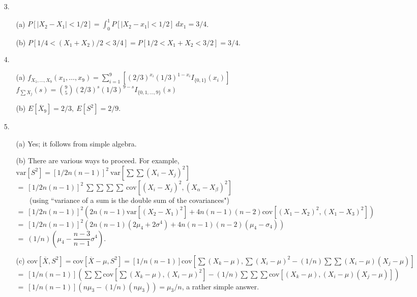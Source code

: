 \begin{enumerate}
	\item[3.] \begin{enumerate}
		\item[(a)] $P[\left\vert X_2-X_1\right\vert <1/2] = \displaystyle\int_0^1 P[\left\vert X_2-x_1\right\vert<1/2]\ dx_1 = 3/4$. 
		\item[(b)] $P[1/4 < (X_1+X_2)/2 <3/4] = P[1/2 < X_1+X_2 < 3/2] = 3/4$.
	\end{enumerate}

	\item[4.]  \begin{enumerate}
		\item[(a)] $f_{X_1,\ldots,X_9}(x_1,\ldots,x_9) = \sum\limits_{i=1}^{9}[(2/3)^{x_i}(1/3)^{1-x_i}I_{\{0,1\}}(x_i)]$ \\
		$f_{\sum X_j}(s) = \displaystyle {9\choose 5}(2/3)^s(1/3)^{9-s}I_{\{0,1,\ldots,9\}}(s)$
		\item[(b)] $E[\overline{X}_9]=2/3,\ E[S^2]=2/9$.
	\end{enumerate}

	\item[5.]  \begin{enumerate}
		\item[(a)] Yes; it follows from simple algebra.
		\item[(b)] There are various ways to proceed.  For example, \\
		$\mbox{var}[S^2]=[1/2n(n-1)]^2\ \mbox{var}[\sum\sum(X_i-X_j)^2]$ \\
		$=\ [1/2n(n-1)]^2\ \sum\sum\sum\sum\ \mbox{cov}[(X_i-X_j)^2, (X_\alpha-X_\beta)^2]$ \\
		$\phantom{=\ }$ (using ``variance of a sum is the double sum of the covariances") \\
		$=\ [1/2n(n-1)]^2(2n(n-1)\mbox{var}[(X_2-X_1)^2] + 4n(n-1)(n-2)\mbox{cov}[(X_1-X_2)^2,(X_1-X_3)^2])$ \\
		$=\ [1/2n(n-1)]^2(2n(n-1)(2\mu_4+2\sigma^4) + 4n(n-1)(n-2)(\mu_4-\sigma_4))$ \\
		$=\ (1/n)(\mu_4 - \dfrac{n-3}{n-1}\sigma^4)$.
		\item[(c)] $\mbox{cov}[\overline{X},S^2] = \mbox{cov}[\overline{X}-\mu, S^2] = [1/n(n-1)]\mbox{cov}[\sum(X_k-\mu), \sum(X_i-\mu)^2-(1/n)\sum\sum(X_i-\mu)(X_j-\mu)]$ \\
		$=\ [1/n(n-1)](\sum\sum\mbox{cov}[\sum(X_k-\mu),(X_i-\mu)^2] - (1/n)\sum\sum\sum\mbox{cov}[(X_k-\mu),(X_i-\mu)(X_j-\mu)])$ \\
		$=\ [1/n(n-1)](n\mu_3 - (1/n)(n\mu_3)) = \mu_3/n$, a rather simple answer.
		\end{enumerate}


\end{enumerate}
